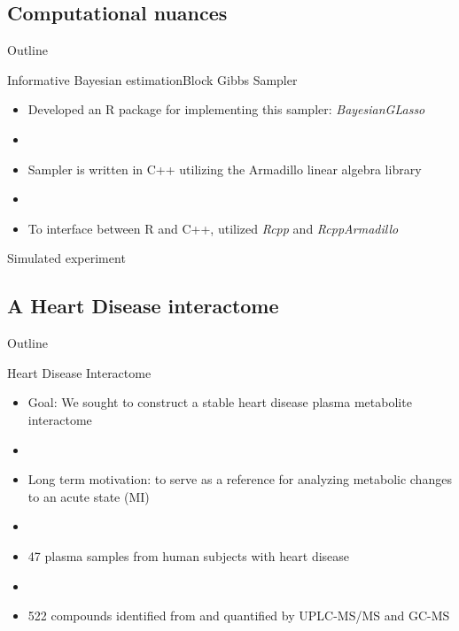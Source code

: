 \documentclass[xcolor=dvipsnames]{beamer}
\begin{document}
\subsection{Computational nuances}
\begin{frame}{Outline}
	\vspace{-10.5pt}
	\tableofcontents[currentsection,subsectionstyle=show/shaded/hide]
\end{frame}
\begin{frame}{Informative Bayesian estimation}{Block Gibbs Sampler}
	\vspace{-15.5pt}
	\begin{itemize}
		\item Developed an R package for implementing this sampler: \emph{BayesianGLasso}
		\item[]
		\item Sampler is written in C++ utilizing the Armadillo linear algebra library
		\item[]
		\item To interface between R and C++, utilized \emph{Rcpp} and \emph{RcppArmadillo}
	\end{itemize}
\end{frame}

\begin{frame}{Simulated experiment}
	\begin{center}
	\end{center}
\end{frame}

\subsection{A Heart Disease interactome}
\begin{frame}{Outline}
	\vspace{-10.5pt}
	\tableofcontents[currentsection,subsectionstyle=show/shaded/hide]
\end{frame}
\begin{frame}{Heart Disease Interactome}
	\vspace{-15.5pt}
	\begin{itemize}
		\item Goal: We sought to construct a stable heart disease plasma metabolite interactome
		\item[]
		\item Long term motivation:  to serve as a reference for analyzing metabolic changes to an acute state (MI)
		\item[]
		\item 47 plasma samples from human subjects with heart disease
		\item[]
		\item 522 compounds identified from and quantified by UPLC-MS/MS and GC-MS
	\end{itemize}
\end{frame}
\end{document}
